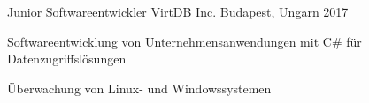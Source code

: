 

\begin{cventries}

  \cventry
    {Junior Softwareentwickler} %
    {VirtDB Inc.} %
    {Budapest, Ungarn} %
    {2017} %
    {
      \begin{cvitems} %
        \item {Softwareentwicklung von Unternehmensanwendungen mit C\# für Datenzugriffslösungen}
        \item {Überwachung von Linux- und Windowssystemen}        
      \end{cvitems}
    }

  
  
\end{cventries}
